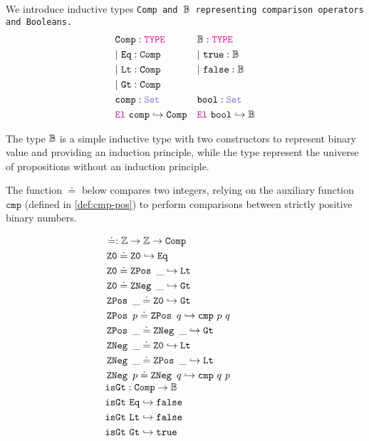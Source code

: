 \begin{definition}\label{def:arith-inequalities-def}
We introduce inductive types \tt{Comp}  and $\mathbb{B}$ representing comparison operators and Booleans.
\begin{align*}
&\tt{Comp}: \type{} & &\B: \type{} \\
&|~\tt{Eq}: \tt{Comp} & &|~\tt{true}: \B \\
&|~\tt{Lt}: \tt{Comp} & &|~\tt{false}: \B \\
&|~\tt{Gt}: \tt{Comp} & & \\
&\tt{comp}: \set & &\tt{bool}: \set  \\
&\el{}~\tt{comp}\index{$\tt{comp}$} \re \tt{Comp} & &\el{}~\tt{bool} \re \B
\end{align*}

The type $\mathbb{B}$ is a simple inductive type with two constructors to represent binary value and providing an induction principle, while the type {\prop} represent the universe of propositions without an induction principle.

The function $\doteq$ below compares two integers, relying on the auxiliary function $\texttt{cmp}$ (defined in \cref{def:cmp-pos}) to perform comparisons between strictly positive binary numbers.

\[
\begin{array}[t]{l@{\hspace{4em}}l}
\begin{aligned}
&\doteq\index{$\doteq$} : \Z \ra \Z \ra \tt{Comp} \\
& \ZO \doteq \ZO \re \tt{Eq} \\
& \ZO \doteq \ZPos~\_ \re \tt{Lt} \\
& \ZO \doteq \ZNeg~\_ \re \tt{Gt} \\
& \ZPos~\_ \doteq \ZO \re \tt{Gt} \\
& \ZPos~p \doteq \ZPos~q \re \tt{cmp}~p~q \\
& \ZPos~\_ \doteq \ZNeg~\_ \re \tt{Gt} \\
& \ZNeg~\_ \doteq \ZO \re \tt{Lt} \\
& \ZNeg~\_ \doteq \ZPos~\_ \re \tt{Lt} \\
& \ZNeg~p \doteq \ZNeg~q \re \tt{cmp}~q~p
\end{aligned}
\\[3em]
\begin{aligned}
  &\tt{isGt} : \tt{Comp} \ra \B \\
  &\tt{isGt}~\tt{Eq} \re \tt{false} \\
  &\tt{isGt}~\tt{Lt} \re \tt{false} \\
  &\tt{isGt}~\tt{Gt} \re \tt{true}
\end{aligned}
\end{array}
\]


\end{definition}
